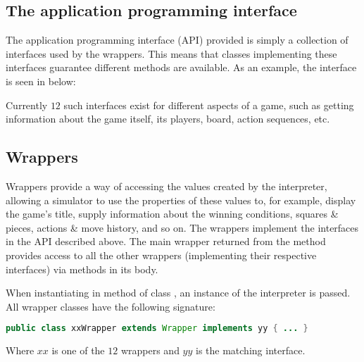 \subsection{The application programming interface}
The application programming interface (API) provided is simply a collection of interfaces used by the wrappers. This means that classes implementing these interfaces guarantee different methods are available. As an example, the  interface is seen in  below:



Currently $12$ such interfaces exist for different aspects of a game,
such as getting information about the game itself, its players,
board, action sequences, etc.

\subsection{Wrappers}
Wrappers provide a way of accessing the values created by the
interpreter, allowing a simulator to use the properties of these
values to, for example, display the game's title, supply information
about the winning conditions, squares \& pieces, actions \& move
history, and so on. The wrappers implement the interfaces in the
API described above. The main wrapper returned from the method
 provides access to all the other wrappers
(implementing their respective interfaces) via methods in its body.

When instantiating  in method  of class , an instance of the interpreter is passed. All wrapper classes have the following signature:

\begin{lstlisting}[language=Java,caption={\emph{The signaure of all API wrapper classes.}}]
  public class xxWrapper extends Wrapper implements yy { ... }
\end{lstlisting}

Where $xx$ is one of the $12$ wrappers and $yy$ is the matching interface.
